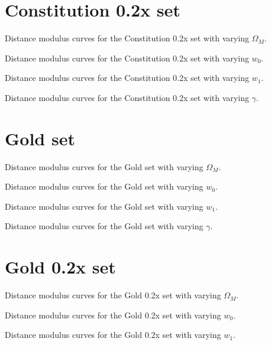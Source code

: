 \section{Constitution 0.2x set}
\label{sec:constitution-02x-set}

  {Distance modulus curves for the Constitution 0.2x set with varying $\Omega_M$.}

  {Distance modulus curves for the Constitution 0.2x set with varying $w_0$.}

  {Distance modulus curves for the Constitution 0.2x set with varying $w_1$.}

  {Distance modulus curves for the Constitution 0.2x set with varying $\gamma$.}


\section{Gold set}
\label{sec:gold-set}

  {Distance modulus curves for the Gold set with varying $\Omega_M$.}

  {Distance modulus curves for the Gold set with varying $w_0$.}

  {Distance modulus curves for the Gold set with varying $w_1$.}

  {Distance modulus curves for the Gold set with varying $\gamma$.}
 
\section{Gold 0.2x set}
\label{sec:gold-02x-set}

  {Distance modulus curves for the Gold 0.2x set with varying $\Omega_M$.}

  {Distance modulus curves for the Gold 0.2x set with varying $w_0$.}

  {Distance modulus curves for the Gold 0.2x set with varying $w_1$.}

